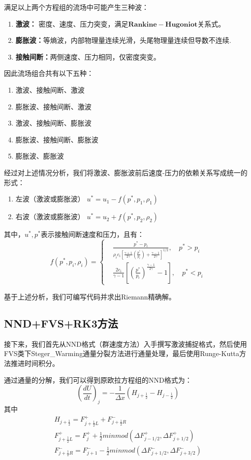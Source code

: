 \documentclass[12pt,a4paper]{article}%
\begin{document}
		满足以上两个方程组的流场中可能产生三种波：
		\begin{enumerate}
		 	\item \textbf{激波：} 密度、速度、压力突变，满足$\mathbf{Rankine-Hugoniot}$关系式。
		 	\item \textbf{膨胀波：}等熵波，内部物理量连续光滑，头尾物理量连续但导数不连续.
		 	\item \textbf{接触间断：}两侧速度、压力相同，仅密度突变。
		\end{enumerate}
		
		因此流场组合共有以下五种：
		\begin{enumerate}
			\item 激波、接触间断、激波
			\item 膨胀波、接触间断、激波
			\item 激波、接触间断、膨胀波
			\item 膨胀波、接触间断、膨胀波
			\item 膨胀波、膨胀波
		\end{enumerate}
		
		经过对上述情况分析，我们将激波、膨胀波前后速度-压力的依赖关系写成统一的形式：
		\begin{enumerate}
		 	\item 左波（激波或膨胀波） $u^* = u_1 - f(p^*,p_1,\rho_1)$
		 	\item 右波（激波或膨胀波） $u^* = u_2 + f(p^*,p_2,\rho_2)$
		\end{enumerate}
		其中，$u^*,p^*$表示接触间断速度和压力，且有：
		\[
		f(p^*,p_i,\rho_i) = 
		\left\{
		\begin{aligned}
		 	& \frac{p^* - p_i}{\rho_i c_i[\frac{\gamma+1}{2\gamma} (\frac{p^*}{p_i}) + \frac{\gamma-1}{2\gamma}]^{1/2}},\quad p^*>p_i \\
		 	& \frac{2c_i}{\gamma-1}[(\frac{p^*}{p_i})^{\frac{\gamma-1}{2\gamma}} - 1],\quad p^*<p_i
		\end{aligned}
		\right.
		\]
		
		基于上述分析，我们可编写代码并求出Riemann精确解。
		 
		\subsection{NND+FVS+RK3方法}
		接下来，我们首先从NND格式（群速度方法）入手撰写激波捕捉格式，然后使用FVS类下Steger\_Warming通量分裂方法进行通量处理，最后使用Runge-Kutta方法推进时间积分。
		
		通过通量的分解，我们可以得到原欧拉方程组的NND格式为：
		\[
			(\frac{dU}{dt})_j = -\frac{1}{\Delta x}(H_{j+\frac12} - H_{j-\frac12})
		\]
		其中
		\begin{gather}
			H_{j+\frac12} = F^{+}_{j+\frac12L} + F^{-}_{j+\frac12R} \\
			F^{+}_{j+\frac12L} = F^+_j + \frac12 minmod(\Delta F^+_{j-1/2},\Delta F^+_{j+1/2}) \\
			F^-_{j+\frac12R} = F^-_{j+1} - \frac12 minmod(\Delta F^-_{j+1/2} , \Delta F^-_{j+3/2})
		\end{gather}
		
\end{document}
